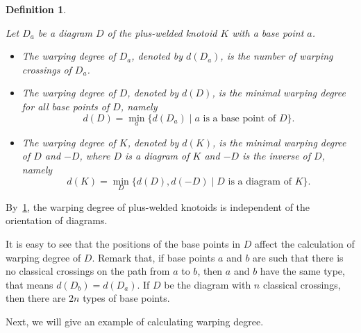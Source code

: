 \documentclass[11pt]{amsart}
\theoremstyle{noparens}
\newtheorem{definition}{Definition}[section]
\numberwithin{equation}{section}
\numberwithin{equation}{section}
\begin{document}
\begin{definition} \label{Definition 4.1} 
\rm{ 
Let $D_{a}$ be a diagram $D$ of the plus-welded knotoid $K$ with a base point $a$.
\begin{itemize}
\item The \textit{warping degree of $D_a$}, denoted by $d(D_a)$, is the number of warping crossings of $D_a$.
\item The \textit{warping degree of $D$}, denoted by $d(D)$, is the minimal warping degree for all base points of $D$, namely  
$$
d(D) = \min_{a} \{d(D_a) \mid \text{$a$ is a base point of $D$}\}.
$$
\item The \textit{warping degree of $K$}, denoted by $d(K)$, is the minimal warping degree of $D$ and $-D$, where $D$ is a diagram of $K$ and $-D$ is the inverse of $D$, namely 
$$ 
d(K) = \min_{D} \{ d(D), d(-D) \mid \text{$D$ is a diagram} \text{ of $K$}\}. 
$$
\end{itemize}
}
\end{definition}

 By~\cref{Definition 4.1}, the warping degree of plus-welded  knotoids is independent of the orientation of diagrams.

It is easy to see that the positions of the base points in $D$ affect the calculation of warping degree of $D$. Remark that, if base points $a$ and $b$ are such that there is no classical crossings on the path from $a$ to $b$, then $a$ and $b$ have the same type, that  means $d(D_b) = d(D_a)$.
If $D$ be the diagram with $n$ classical crossings, then there are  $2n$ types of base points. 

Next, we will give an example of calculating warping degree. 
\end{document}
